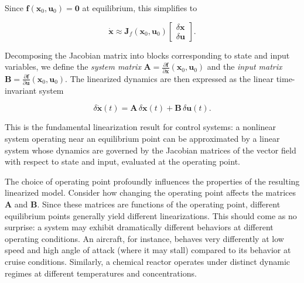 Since $\mathbf{f}(\mathbf{x}_0, \mathbf{u}_0) = \mathbf{0}$ at equilibrium, this simplifies to

\[
\dot{\mathbf{x}} \approx \mathbf{J}_f(\mathbf{x}_0, \mathbf{u}_0) \begin{bmatrix} \delta\mathbf{x} \\ \delta\mathbf{u} \end{bmatrix}.
\]

Decomposing the Jacobian matrix into blocks corresponding to state and input variables, we define the \emph{system matrix} $\mathbf{A} = \frac{\partial \mathbf{f}}{\partial \mathbf{x}}(\mathbf{x}_0, \mathbf{u}_0)$ and the \emph{input matrix} $\mathbf{B} = \frac{\partial \mathbf{f}}{\partial \mathbf{u}}(\mathbf{x}_0, \mathbf{u}_0)$. The linearized dynamics are then expressed as the linear time-invariant system

\[
\delta\dot{\mathbf{x}}(t) = \mathbf{A} \, \delta\mathbf{x}(t) + \mathbf{B} \, \delta\mathbf{u}(t).
\]

This is the fundamental linearization result for control systems: a nonlinear system operating near an equilibrium point can be approximated by a linear system whose dynamics are governed by the Jacobian matrices of the vector field with respect to state and input, evaluated at the operating point.

The choice of operating point profoundly influences the properties of the resulting linearized model. Consider how changing the operating point affects the matrices $\mathbf{A}$ and $\mathbf{B}$. Since these matrices are functions of the operating point, different equilibrium points generally yield different linearizations. This should come as no surprise: a system may exhibit dramatically different behaviors at different operating conditions. An aircraft, for instance, behaves very differently at low speed and high angle of attack (where it may stall) compared to its behavior at cruise conditions. Similarly, a chemical reactor operates under distinct dynamic regimes at different temperatures and concentrations.

